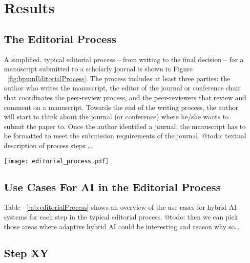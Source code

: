 \section{Results}
\label{sec:results}

\subsection{The Editorial Process}

A simplified, typical editorial process -- from writing to the final decision -- for a manuscript submitted to a scholarly journal is shown in
Figure ~\ref{fig:bpmnEditorialProcess}. The process includes at least three parties: the author who writes the manuscript, the editor of the
journal or conference chair that coordinates the peer-review process, and the peer-reviewers that review and comment on a manuscript. Towards
the end of the writing process, the author will start to think about the journal (or conference) where he/she wants to submit the paper to.
Once the author identified a journal, the manuscript has to be formatted to meet the submission requirements of the journal. 
{\color{purple} @todo: textual description of process steps \dots}

\begin{figure*}[htb]
    \centering
    \texttt{[image: editorial\_process.pdf]}
    \caption{A simplified, typical editorial process from writing the manuscript to the final decision of acceptance or
    rejection for publication (in BPMN 2.0). For better understanding, the process steps performed by outside parties 
    are also modelled and the process starts with the outside party (author) writing the manuscript. The numbers
    indicate the sequence flow of the process.}
    \label{fig:bpmnEditorialProcess}
\end{figure*}

\subsection{Use Cases For AI in the Editorial Process}

Table  ~\ref{tab:editorialProcess} shows an overview of the use cases for hybrid AI systems for each step in the typical editorial process.
{\color{purple} @todo: then we can pick those areas where adaptive hybrid AI could be interesting and reason why so\dots}


\subsection{Step XY}

